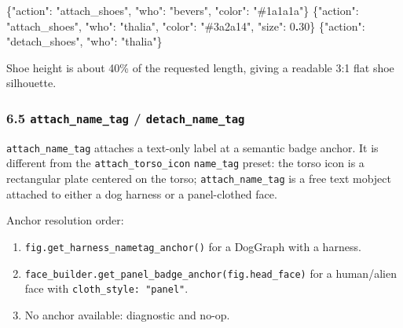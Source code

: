 \documentclass[
  12pt,
  letterpaper,
]{book}
\newenvironment{Shaded}{}{}
\newcommand{\DataTypeTok}[1]{\textcolor[rgb]{0.56,0.13,0.00}{#1}}
\newcommand{\DecValTok}[1]{\textcolor[rgb]{0.25,0.63,0.44}{#1}}
\newcommand{\ErrorTok}[1]{\textcolor[rgb]{1.00,0.00,0.00}{\textbf{#1}}}
\newcommand{\FunctionTok}[1]{\textcolor[rgb]{0.02,0.16,0.49}{#1}}
\newcommand{\StringTok}[1]{\textcolor[rgb]{0.25,0.44,0.63}{#1}}
\providecommand{\tightlist}{%
  \setlength{\itemsep}{0pt}\setlength{\parskip}{0pt}}
\begin{document}
\begin{Shaded}
\begin{Highlighting}[]
\FunctionTok{\{}\DataTypeTok{"action"}\FunctionTok{:} \StringTok{"attach\_shoes"}\FunctionTok{,} \DataTypeTok{"who"}\FunctionTok{:} \StringTok{"bevers"}\FunctionTok{,} \DataTypeTok{"color"}\FunctionTok{:} \StringTok{"\#1a1a1a"}\FunctionTok{\}}
\FunctionTok{\{}\DataTypeTok{"action"}\FunctionTok{:} \StringTok{"attach\_shoes"}\FunctionTok{,} \DataTypeTok{"who"}\FunctionTok{:} \StringTok{"thalia"}\FunctionTok{,} \DataTypeTok{"color"}\FunctionTok{:} \StringTok{"\#3a2a14"}\FunctionTok{,} \DataTypeTok{"size"}\FunctionTok{:} \DecValTok{0}\ErrorTok{.}\DecValTok{30}\FunctionTok{\}}
\FunctionTok{\{}\DataTypeTok{"action"}\FunctionTok{:} \StringTok{"detach\_shoes"}\FunctionTok{,} \DataTypeTok{"who"}\FunctionTok{:} \StringTok{"thalia"}\FunctionTok{\}}
\end{Highlighting}
\end{Shaded}

Shoe height is about 40\% of the requested length, giving a readable 3:1
flat shoe silhouette.

\subsubsection{\texorpdfstring{6.5 \texttt{attach\_name\_tag} /
\texttt{detach\_name\_tag}}{6.5 attach\_name\_tag / detach\_name\_tag}}\label{attach_name_tag-detach_name_tag}

\texttt{attach\_name\_tag} attaches a text-only label at a semantic
badge anchor. It is different from the \texttt{attach\_torso\_icon}
\texttt{name\_tag} preset: the torso icon is a rectangular plate
centered on the torso; \texttt{attach\_name\_tag} is a free text mobject
attached to either a dog harness or a panel-clothed face.

Anchor resolution order:

\begin{enumerate}
\def\labelenumi{\arabic{enumi}.}
\tightlist
\item
  \texttt{fig.get\_harness\_nametag\_anchor()} for a DogGraph with a
  harness.
\item
  \texttt{face\_builder.get\_panel\_badge\_anchor(fig.head\_face)} for a
  human/alien face with \texttt{cloth\_style:\ "panel"}.
\item
  No anchor available: diagnostic and no-op.
\end{enumerate}
\end{document}
